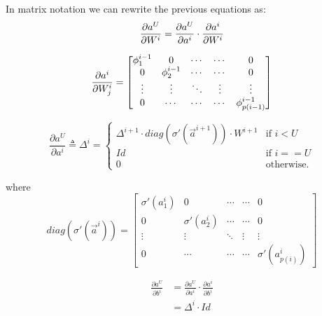 In matrix notation we can rewrite the previous equations as:
\begin{equation}
 \frac{\partial a^U}{\partial W^i} = \frac{\partial a^U}{\partial a^{i}} \cdot \frac{\partial a^{i}}{\partial W^i}
\end{equation}


\begin{equation}
\frac{\partial a^{i}}{\partial W_j^i} =
 \begin{bmatrix}
   \phi_1^{i-1}    & 0                & \cdots      & \cdots       & 0  \\
   0               & \phi_2^{i-1}     & \cdots      & \cdots       & 0  \\
   \vdots          & \vdots           & \ddots      & \vdots       &\vdots\\
   0               & \cdots           & \cdots      & \cdots       & \phi^{i-1}_{p(i-1)}
\end{bmatrix}
\end{equation}

\begin{equation}
\frac{\partial a^U}{\partial a^{i}} \triangleq \Delta^{i} = 
\begin{cases}
      \Delta^{i+1} \cdot diag(\sigma'(\vec{a}^{i+1})) \cdot W^{i+1}  & \text{if } i<U\\
      Id & \text{if } i==U\\
    0 & \text{otherwise}.
\end{cases}
\label{fnn_delta}
\end{equation}

where
\begin{equation}
diag(\sigma'(\vec{a}^{i})) =
 \begin{bmatrix}
   \sigma'(a^{i}_1)    & 0                & \cdots      & \cdots       & 0  \\
   0                     & \sigma'(a^{i}_2)     & \cdots      & \cdots       & 0  \\
   \vdots                & \vdots           & \ddots      & \vdots       &\vdots\\
   0                     & \cdots           & \cdots      & \cdots       &\sigma'(a^{i}_{p(i)})
\end{bmatrix}
\end{equation}

\begin{align}
\frac{\partial a^U}{\partial b^i} &= \frac{\partial a^U}{\partial a^i} \cdot \frac{\partial a^i}{\partial b^i}\\
&= \Delta^{i} \cdot Id
\end{align}


